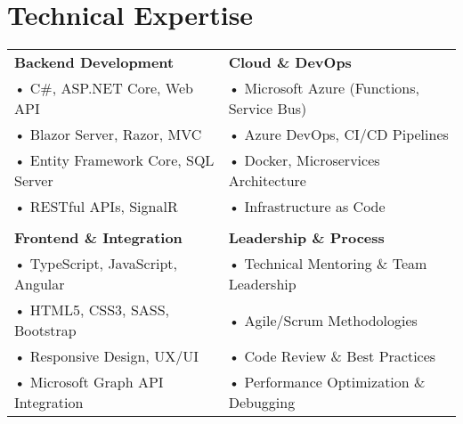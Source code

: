 \documentclass[paper=a4,fontsize=11pt]{article}
\newcommand{\sepspace}{\vspace*{0.8em}}
\newcommand{\NewPart}[1]{\section{#1}}
\begin{document}
\NewPart{Technical Expertise}
\noindent
\begin{tabularx}{\textwidth}{@{}X X@{}}
\textbf{\color{primary}Backend Development} & \textbf{\color{primary}Cloud \& DevOps} \\
• C\#, ASP.NET Core, Web API & • Microsoft Azure (Functions, Service Bus) \\
• Blazor Server, Razor, MVC & • Azure DevOps, CI/CD Pipelines \\
• Entity Framework Core, SQL Server & • Docker, Microservices Architecture \\
• RESTful APIs, SignalR & • Infrastructure as Code \\
\\[-0.5em]
\textbf{\color{primary}Frontend \& Integration} & \textbf{\color{primary}Leadership \& Process} \\
• TypeScript, JavaScript, Angular & • Technical Mentoring \& Team Leadership \\
• HTML5, CSS3, SASS, Bootstrap & • Agile/Scrum Methodologies \\
• Responsive Design, UX/UI & • Code Review \& Best Practices \\
• Microsoft Graph API Integration & • Performance Optimization \& Debugging \\
\end{tabularx}

\sepspace

	
\end{document}
